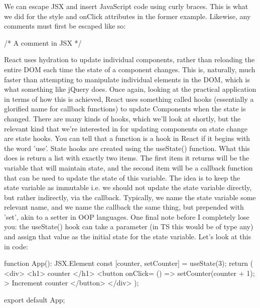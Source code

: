 \documentclass{article}
\begin{document}
We can escape JSX and insert JavaScript code using curly braces. This is what we did for the style and onClick 
attributes in the former example. Likewise, any comments must first be escaped like so:

\begin{tslst}

{ /* A comment in JSX */ }

\end{tslst}

React uses hydration to update individual components, rather than reloading the entire DOM each time the state 
of a component changes. This is, naturally, much faster than attempting to manipulate individual elements in 
the DOM, which is what something like jQuery does. Once again, looking at the practical application in terms of 
how this is achieved, React uses something called hooks (essentially a glorified name for callback functions) 
to update Components when the state is changed. There are many kinds of hooks, which we'll look at shortly, but 
the relevant kind that we're interested in for updating components on state change are state hooks. You can 
tell that a function is a hook in React if it begins with the word 'use'. State hooks are created using the 
useState() function. What this does is return a list with exactly two items. The first item it returns will be 
the variable that will maintain state, and the second item will be a callback function that can be used to 
update the state of this variable. The idea is to keep the state variable as immutable i.e. we should not 
update the state variable directly, but rather indirectly, via the callback. Typically, we name the state 
variable some relevant name, and we name the callback the same thing, but prepended with 'set', akin to a 
setter in OOP languages. One final note before I completely lose you: the useState() hook can take a parameter 
(in TS this would be of type any) and assign that value as the initial state for the state variable. Let's 
look at this in code:

\begin{tslst}

function App(): JSX.Element {
    const [counter, setCounter] = useState(3);
    return (
        <div>
            <h1>{ counter }</h1>
            <button onClick={ () => { setCounter(counter + 1); } }>
                Increment counter
            </button>
        </div>
    );
}

export default App;

\end{tslst}
\end{document}
